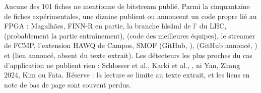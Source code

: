 Aucune des 101 fiches ne mentionne de bitstream publié. Parmi la cinquantaine de fiches
expérimentales, une dizaine publient ou annoncent un code propre lié au FPGA :
Magalhães, FINN-R en partie, la branche hls4ml de l' du LHC,  (probablement la
partie entraînement),  (code des meilleures équipes), le streamer de FCMP,
l'extension HAWQ de Campos, SMOF\pp{} (GitHub,
\citealp{arxiv-2403.18921-smof-streaming-modern-cnns-fpgas}),  (GitHub annoncé,
\citealp{2024-aggarwal-chameleon-dual-memory-replay-online}) et \pp{} (lien annoncé,
absent du texte extrait). Les détecteurs les plus proches du cas d'application ne
publient rien : Schlosser et al., Karki et al.\pp, \pp, ni Yan, Zhang 2024, Kim ou
Fata. Réserve : la lecture se limite au texte extrait, et les liens en note de bas de page
sont souvent perdus.
